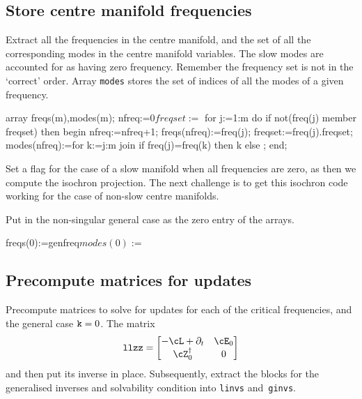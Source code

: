 \documentclass[11pt,a5paper]{article}
\newcommand{\adj}[1]{#1^\dagger} %
\begin{document}
\subsection{Store centre manifold frequencies}
Extract all the frequencies in the centre manifold, and the set of all the corresponding modes in the centre manifold variables.
The slow modes are accounted for as having zero frequency.
Remember the frequency set is not in the `correct' order.
Array \verb|modes| stores the set of indices of all the modes of a given frequency.

\begin{reduce}
array freqs(m),modes(m); 
nfreq:=0$ freqset:={}$ 
for j:=1:m do if not(freq(j) member freqset) then begin
  nfreq:=nfreq+1; 
  freqs(nfreq):=freq(j);
  freqset:=freq(j).freqset;
  modes(nfreq):=for k:=j:m join 
    if freq(j)=freq(k) then {k} else {};
end;
\end{reduce}

Set a flag for the case of a slow manifold when all frequencies are zero, as then we compute the isochron projection.
The next challenge is to get this isochron code working for the case of non-slow centre manifolds.

Put in the non-singular general case as the zero entry of the arrays.

\begin{reduce}
freqs(0):=genfreq$
modes(0):={}$
\end{reduce}
 
\subsection{Precompute matrices for updates}

Precompute matrices to solve for updates for each of the critical frequencies, and the general case $\verb|k|=0$.
The matrix 
\begin{equation*}
\verb|llzz| = \begin{bmatrix} -\cL+\partial_t & \cE_0 
\\ \adj\cZ_0 & 0 \end{bmatrix}
\end{equation*}
and then put its inverse in place.
Subsequently, extract the blocks for the generalised inverses and solvability condition into \verb|linvs| and~\verb|ginvs|.
\end{document}
